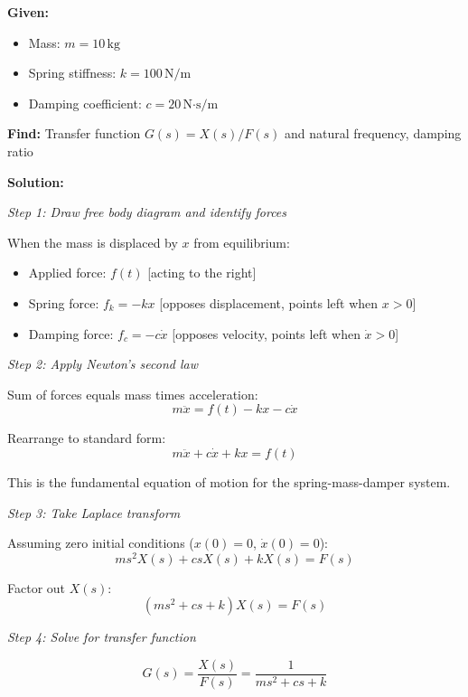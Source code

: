 \begin{example}
\textbf{Given:}
\begin{itemize}
    \item Mass: $m = 10\,\text{kg}$
    \item Spring stiffness: $k = 100\,\text{N/m}$
    \item Damping coefficient: $c = 20\,\text{N·s/m}$
\end{itemize}

\textbf{Find:} Transfer function $G(s) = X(s)/F(s)$ and natural frequency, damping ratio

\textbf{Solution:}

\textit{Step 1: Draw free body diagram and identify forces}

When the mass is displaced by $x$ from equilibrium:
\begin{itemize}
    \item Applied force: $f(t)$ [acting to the right]
    \item Spring force: $f_k = -kx$ [opposes displacement, points left when $x > 0$]
    \item Damping force: $f_c = -c\dot{x}$ [opposes velocity, points left when $\dot{x} > 0$]
\end{itemize}

\textit{Step 2: Apply Newton's second law}

Sum of forces equals mass times acceleration:
\begin{equation}
m\ddot{x} = f(t) - kx - c\dot{x}
\end{equation}

Rearrange to standard form:
\begin{equation}
m\ddot{x} + c\dot{x} + kx = f(t)
\label{eq:smd_diffeq}
\end{equation}

This is the fundamental equation of motion for the spring-mass-damper system.

\textit{Step 3: Take Laplace transform}

Assuming zero initial conditions ($x(0) = 0$, $\dot{x}(0) = 0$):
\begin{equation}
m s^2 X(s) + c s X(s) + k X(s) = F(s)
\end{equation}

Factor out $X(s)$:
\begin{equation}
(ms^2 + cs + k) X(s) = F(s)
\end{equation}

\textit{Step 4: Solve for transfer function}

\begin{equation}
G(s) = \frac{X(s)}{F(s)} = \frac{1}{ms^2 + cs + k}
\end{equation}


\end{example}
